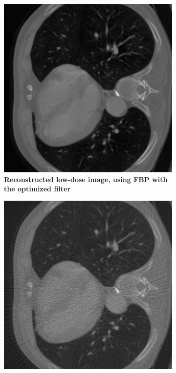 \documentclass[12pt,a4paper]{article}
\begin{document}
\begin{figure}[h!]
\begin{subfigure}[t]{\size\textwidth}
        \includegraphics[width=\textwidth]{Bachelorthesis//UsedImages/l2_0.001_50_3000.png}
        \caption{\textbf{Reconstructed low-dose image, using FBP with the optimized filter}}
        \label{fig:windowII+l2+slow50_learned}
    \end{subfigure}
    \hfill
    \begin{subfigure}[t]{\size\textwidth}
        \centering
       \includegraphics[width=\textwidth]{Bachelorthesis//UsedImages/vanilla_50.png}

\end{subfigure}
\end{figure}
\end{document}
